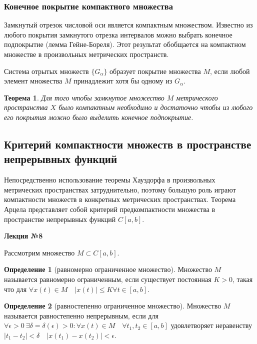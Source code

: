 \documentclass[14pt,a4paper]{extarticle}
\newtheorem{theorem}{Теорема}[section]
\theoremstyle{definition}
\newtheorem{definition}{Определение}[section]
\theoremstyle{remark}
\renewcommand{\[}{\begin{dmath*}[compact]}
\renewcommand{\]}{\end{dmath*}}
\begin{document}
\subsubsection{Конечное покрытие компактного множества}

Замкнутый отрезок числовой оси является компактным множеством.
Известно из любого покрытия замкнутого отрезка интервалов можно выбрать
конечное подпокрытие (лемма Гейне-Бореля).
Этот результат обобщается на компактном множестве в произвольных
метрических пространств.

Система отрытых множеств $\{G_\alpha\}$ образует покрытие множества $M$,
если любой элемент множества $M$ принадлежит хотя бы одному из $G_\alpha$.

\begin{theorem}
  Для того чтобы замкнутое множество $M$ метрического пространства $X$ было
  компактным необходимо и достаточно чтобы из любого его покрытия можно было
  выделить конечное подпокрытие.
\end{theorem}

\subsection{Критерий компактности множеств в пространстве непрерывных функций}

Непосредственно использование теоремы Хауздорфа в произвольных
метрических пространствах затруднительно, поэтому большую роль играют
компактности множеств в конкретных метрических пространствах.
Теорема Арцела представляет собой критерий предкомпактности множества
в пространстве непрерывных функций $C[a,b]$.

\textbf{Лекция №8}

Рассмотрим множество $M\subset C[a,b]$.

\begin{definition}[равномерно ограниченное множество]
  Множество $M$ называется равномерно ограниченным,
  если существует постоянная $K>0$, такая что для
  $\forall x(t)\in M \quad |x(t)|\leq K \forall t \in [a,b]$.
\end{definition}

\begin{definition}[равностепенно ограниченное множество]
  Множество $M$ называется равностепенно непрерывным, если для
  $\forall \epsilon > 0 \ \exists \delta = \delta(\epsilon)>0:
  \forall x(t)\in M\quad \forall t_1,t_2\in [a,b]$
  удовлетворяет неравенству $|t_1-t_2|<\delta \quad |x(t_1)-x(t_2)|<\epsilon$.
\end{definition}
\end{document}
